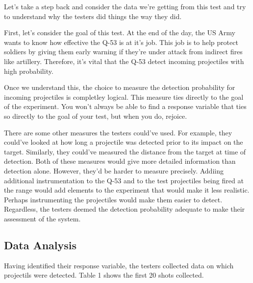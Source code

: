 \documentclass[
]{book}
\newenvironment{Shaded}{\begin{snugshade}}{\end{snugshade}}
\newcommand{\DecValTok}[1]{\textcolor[rgb]{0.00,0.00,0.81}{#1}}
\newcommand{\KeywordTok}[1]{\textcolor[rgb]{0.13,0.29,0.53}{\textbf{#1}}}
\newcommand{\NormalTok}[1]{#1}
\newcommand{\OperatorTok}[1]{\textcolor[rgb]{0.81,0.36,0.00}{\textbf{#1}}}
\newcommand{\StringTok}[1]{\textcolor[rgb]{0.31,0.60,0.02}{#1}}
\theoremstyle{definition}
\theoremstyle{definition}
\theoremstyle{definition}
\theoremstyle{remark}
\begin{document}
Let's take a step back and consider the data we're getting from this test and try to understand why the testers did things the way they did.

First, let's consider the goal of this test. At the end of the day, the US Army wants to know how effective the Q-53 is at it's job. This job is to help protect soldiers by giving them early warning if they're under attack from indirect fires like artillery. Therefore, it's vital that the Q-53 detect incoming projectiles with high probability.

Once we understand this, the choice to measure the detection probability for incoming projectiles is completley logical. This measure ties directly to the goal of the experiment. You won't always be able to find a response variable that ties so directly to the goal of your test, but when you do, rejoice.

There are some other measures the testers could've used. For example, they could've looked at how long a projectile was detected prior to its impact on the target. Similarly, they could've measured the distance from the target at time of detection. Both of these measures would give more detailed information than detection alone. However, they'd be harder to measure precisely. Addiing additional instrumentation to the Q-53 and to the test projectiles being fired at the range would add elements to the experiment that would make it less realistic. Perhaps instrumenting the projectiles would make them easier to detect. Regardless, the testers deemed the detection probability adequate to make their assessment of the system.

\hypertarget{data-analysis}{%
\subsection{Data Analysis}\label{data-analysis}}

Having identified their response variable, the testers collected data on which projectils were detected. Table 1 shows the first 20 shots collected.

\begin{Shaded}
\end{Shaded}
\end{document}
